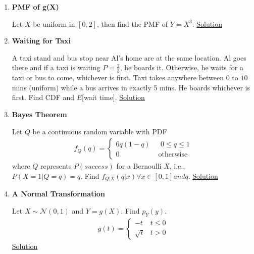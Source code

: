 \documentclass[11pt, a4paper]{article}
\begin{document}
\begin{enumerate}
    \item \hypertarget{q_pmffn}{\textbf{PMF of g(X)}}\newline
    Let $X$ be uniform in $[0, 2]$, then find the PMF of $Y = X^{3}$. \hyperlink{a_pmffn}{Solution}

    \item \hypertarget{q_waittaxi}{\textbf{Waiting for Taxi}}\newline
    A taxi stand and bus stop near Al's home are at the same location. Al goes there and if a taxi is waiting $P=\frac{2}{3}$, he boards it. Otherwise, he waits for a taxi or bus to come, whichever is first. Taxi takes anywhere between $0$ to $10$ mins (uniform) while a bus arrives in exactly 5 mins. He boards whichever is first. Find CDF and $E$[wait time]. \hyperlink{a_waittaxi}{Solution}
    
    \item \hypertarget{q_bayes}{\textbf{Bayes Theorem}}\newline
    Let $Q$ be a continuous random variable with PDF
    \begin{align*}
        f_{Q}(q) = \begin{cases} 6q(1-q) &\mbox{ $0 \leq q \leq 1$}\\
                                 0 &\mbox{ otherwise} \end{cases}
    \end{align*}
    where $Q$ represents $P(success)$ for a Bernoulli $X$, i.e., $P(X=1|Q=q) = q$. Find $f_{Q|X}(q|x) \forall x \in [0,1] and q$. \hyperlink{a_bayes}{Solution}
    
    \item \hypertarget{q_normaltr}{\textbf{A Normal Transformation}}\newline
    Let $X \sim \mathcal{N}(0,1)$ and $Y = g(X)$. Find $p_{Y}(y)$. 
    \begin{align*}
        g(t) = \begin{cases} -t &\mbox{$t \leq 0$}\\
                            \sqrt{t} &\mbox{$t > 0$} \end{cases}
    \end{align*}
    \hyperlink{a_normaltr}{Solution}


\end{enumerate}
\end{document}
